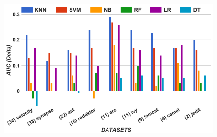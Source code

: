 
\begin{figure}[!t]
\begin{minipage}{.5\linewidth}
\centering
        \includegraphics[width=.95\linewidth]{./fig/AUC_untuned.png}
        

\end{minipage}
\end{figure}
